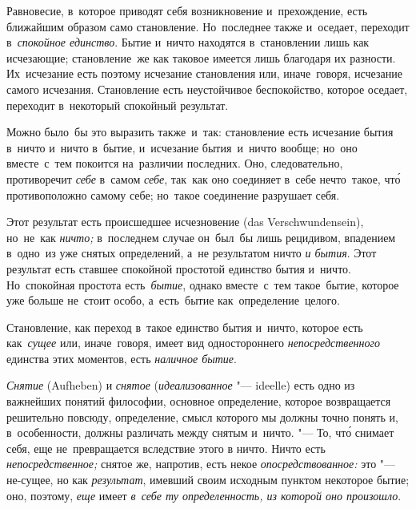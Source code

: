 Равновесие, в~которое приводят себя возникновение и~прехождение, есть ближайшим
образом само становление. Но~последнее также и~оседает, переходит
в~{\em спокойное единство}. Бытие и~ничто находятся в~становлении лишь как
исчезающие; становление~же как таковое имеется лишь благодаря их разности.
Их~исчезание есть поэтому исчезание становления или, иначе~говоря, исчезание
самого исчезания. Становление есть неустойчивое беспокойство, которое оседает,
переходит в~некоторый спокойный результат.

Можно было~бы это выразить также~и~так: становление есть исчезание бытия
в~ничто и~ничто в~бытие, и~исчезание бытия~и~ничто вообще; но~оно вместе~с~тем
покоится на~различии последних. Оно, следовательно, противоречит {\em себе}
в~самом {\em себе}, так~как оно соединяет в~себе нечто~такое, чт\'{о}
противоположно самому себе; но~такое соединение разрушает себя.

Этот результат есть происшедшее исчезновение (das Ver\-schwun\-den\-sein),
но~не~как {\em ничто;} в~последнем случае он~был~бы лишь рецидивом, впадением
в~одно~из уже снятых определений, а~не результатом ничто {\em и бытия}. Этот
результат есть ставшее спокойной простотой единство бытия и~ничто. Но~спокойная
простота есть~{\em бытие}, однако вместе~с~тем такое~бытие, которое уже больше
не~стоит особо, а~есть~бытие как~определение~целого.

Становление, как переход в~такое единство бытия и~ничто, которое есть
как~{\em сущее} или, иначе~говоря, имеет вид одностороннего
{\em непосредственного} единства этих моментов, есть {\em наличное бытие}.


{\em Снятие} (Aufheben) и {\em снятое} ({\em идеализованное} "--- ideelle) есть
одно из важнейших понятий философии, основное определение, которое возвращается
решительно повсюду, определение, смысл которого мы должны точно понять и,
в~особенности, должны различать между снятым и~ничто. "--- То, чт\'{о} снимает
себя, еще не~превращается вследствие этого в ничто. Ничто есть {\em
непосредственное;} снятое же, напротив, есть некое {\em опосредствованное:} это
"--- не-сущее, но как {\em результат}, имевший своим исходным пунктом некоторое
бытие; оно, поэтому, {\em еще} имеет {\em в~себе ту определенность, из которой
оно произошло}.

